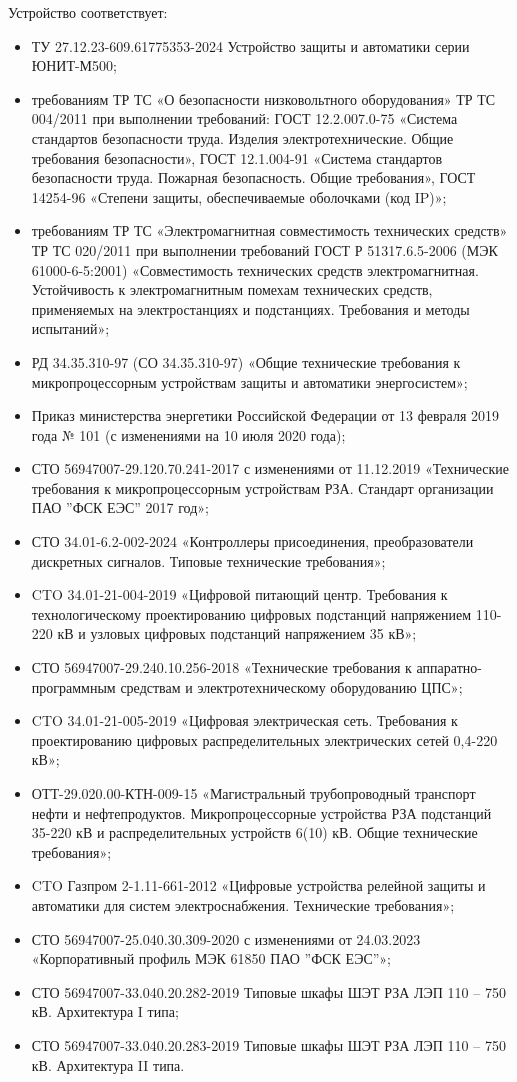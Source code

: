 \par
Устройство соответствует:
\begin{itemize}
\item ТУ 27.12.23-609.61775353-2024 Устройство защиты и автоматики серии ЮНИТ-М500;
\item требованиям ТР ТС «О безопасности низковольтного оборудования» ТР ТС 004/2011 при выполнении требований: ГОСТ 12.2.007.0-75 «Система стандартов безопасности труда. Изделия электротехнические. Общие требования безопасности», ГОСТ 12.1.004-91 «Система стандартов безопасности труда. Пожарная безопасность. Общие требования», ГОСТ 14254-96 «Степени защиты, обеспечиваемые оболочками (код IP)»; 
\item требованиям ТР ТС «Электромагнитная совместимость технических средств» ТР ТС 020/2011 при выполнении требований ГОСТ Р 51317.6.5-2006 (МЭК 61000-6-5:2001) «Совместимость технических средств электромагнитная. Устойчивость к электромагнитным помехам технических средств, применяемых на электростанциях и подстанциях. Требования и методы испытаний»;
\item РД 34.35.310-97 (СО 34.35.310-97) «Общие технические требования к микропроцессорным устройствам защиты и автоматики энергосистем»;
\item Приказ министерства энергетики Российской Федерации от 13 февраля 2019 года № 101 (с изменениями на 10 июля 2020 года);
\item СТО 56947007-29.120.70.241-2017 с изменениями от 11.12.2019 «Технические требования к микропроцессорным устройствам РЗА. Стандарт организации ПАО ''ФСК ЕЭС'' 2017 год»;
\item СТО 34.01-6.2-002-2024 «Контроллеры присоединения, преобразователи дискретных сигналов. Типовые технические требования»;
\item CTO 34.01-21-004-2019 «Цифровой питающий центр. Требования к технологическому проектированию цифровых подстанций напряжением 110-220 кВ и узловых цифровых подстанций напряжением 35 кВ»;
\item СТО 56947007-29.240.10.256-2018 «Технические требования к аппаратно-программным средствам и электротехническому оборудованию ЦПС»;
\item CTO 34.01-21-005-2019 «Цифровая электрическая сеть. Требования к проектированию цифровых распределительных электрических сетей 0,4-220 кВ»;
\item \sloppy ОТТ-29.020.00-КТН-009-15 «Магистральный трубопроводный транспорт нефти и нефтепродуктов. Микропроцессорные устройства РЗА подстанций 35-220 кВ и распределительных устройств 6(10) кВ. Общие технические требования»;
\item CTO Газпром 2-1.11-661-2012 «Цифровые устройства релейной защиты и автоматики для систем электроснабжения. Технические требования»;
\item СТО 56947007-25.040.30.309-2020 с изменениями от 24.03.2023 «Корпоративный профиль МЭК 61850 ПАО ''ФСК ЕЭС''»;
\item СТО 56947007-33.040.20.282-2019 Типовые шкафы ШЭТ РЗА ЛЭП 110 – 750 кВ. Архитектура I типа;
\item СТО 56947007-33.040.20.283-2019 Типовые шкафы ШЭТ РЗА ЛЭП 110 – 750 кВ. Архитектура II типа.
\end{itemize}

